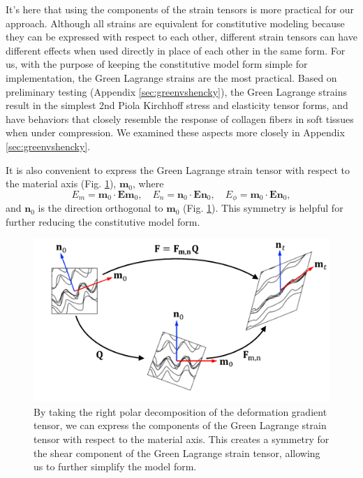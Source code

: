     
    It's here that using the components of the strain tensors is more practical for our approach. Although all strains are equivalent for constitutive modeling because they can be expressed with respect to each other, different strain tensors can have different effects when used directly in place of each other in the same form. For us, with the purpose of keeping the constitutive model form simple for implementation, the Green Lagrange strains are the most practical. Based on preliminary testing (Appendix \ref{sec:greenvshencky}), the Green Lagrange strains result in the simplest 2nd Piola Kirchhoff stress and elasticity tensor forms, and have behaviors that closely resemble the response of collagen fibers in soft tissues when under compression. We examined these aspects more closely in Appendix \ref{sec:greenvshencky}. 
    
    It is also convenient to express the Green Lagrange strain tensor with respect to the material axis (Fig. \ref{fig:greenkinematics}), $\mathbf{m}_0$, where
\begin{equation} \label{eqn:greenstrain}
E_m = \mathbf{m}_0\cdot\mathbf{E}\mathbf{m}_0, \quad E_n = \mathbf{n}_0\cdot\mathbf{E}\mathbf{n}_0, \quad E_{\phi} = \mathbf{m}_0\cdot\mathbf{E}\mathbf{n}_0,
\end{equation} 
    and $\mathbf{n}_0$ is the direction orthogonal to $\mathbf{m}_0$ (Fig. \ref{fig:greenkinematics}). This symmetry is helpful for further reducing the constitutive model form. 


\begin{figure}
\centering
\includegraphics[width=5.0in]{Images/chapter5/greenkinematics.pdf}
\caption{By taking the right polar decomposition of the deformation gradient tensor, we can express the components of the Green Lagrange strain tensor with respect to the material axis. This creates a symmetry for the shear component of the Green Lagrange strain tensor, allowing us to further simplify the model form.}
\label{fig:greenkinematics}
\end{figure}












